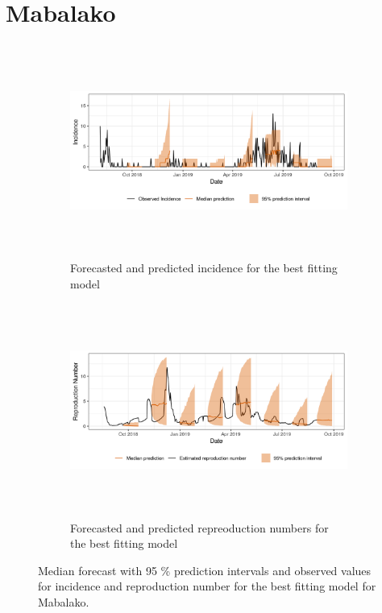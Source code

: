  \section{ Mabalako }\begin{figure}[H]\begin{subfigure}{\textwidth}  \centering  \includegraphics[width=0.9\linewidth, height=7cm]{../output/Mabalako_predictions.png}  \caption{Forecasted and predicted incidence for the best fitting model}\end{subfigure}

\begin{subfigure}{\textwidth}  \centering  \includegraphics[width=0.9\linewidth, height=7cm]{../output/Mabalako_Rs.png}  \caption{Forecasted and predicted repreoduction numbers for the best fitting model}\end{subfigure}  \caption{Median forecast with 95 \% prediction intervals and observed values for incidence and reproduction number for the best fitting model for Mabalako.}\end{figure}

